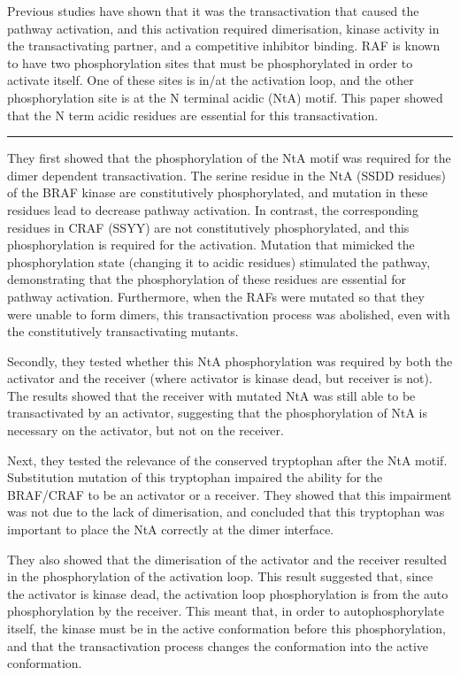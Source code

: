 \documentclass[a4paper,12pt]{article}
\begin{document}
Previous studies have shown that it was the transactivation that caused the pathway activation, and this activation required dimerisation, kinase activity in the transactivating partner, and a competitive inhibitor binding.
RAF is known to have two phosphorylation sites that must be phosphorylated in order to activate itself.
One of these sites is in/at the activation loop, and the other phosphorylation site is at the N terminal acidic (NtA) motif.
This paper showed that the N term acidic residues are essential for this transactivation.

\noindent\rule{\textwidth}{0.4pt}

They first showed that the phosphorylation of the NtA motif was required for the dimer dependent transactivation.
The serine residue in the NtA (SSDD residues) of the BRAF kinase are constitutively phosphorylated, and mutation in these residues lead to decrease pathway activation.
In contrast, the corresponding residues in CRAF (SSYY) are not constitutively phosphorylated, and this phosphorylation is required for the activation.
Mutation that mimicked the phosphorylation state (changing it to acidic residues) stimulated the pathway, demonstrating that the phosphorylation of these residues are essential for pathway activation.
Furthermore, when the RAFs were mutated so that they were unable to form dimers, this transactivation process was abolished, even with the constitutively transactivating mutants.

Secondly, they tested whether this NtA phosphorylation was required by both the activator and the receiver (where activator is kinase dead, but receiver is not).
The results showed that the receiver with mutated NtA was still able to be transactivated by an activator, suggesting that the phosphorylation of NtA is necessary on the activator, but not on the receiver.

Next, they tested the relevance of the conserved tryptophan after the NtA motif.
Substitution mutation of this tryptophan impaired the ability for the BRAF/CRAF to be an activator or a receiver.
They showed that this impairment was not due to the lack of dimerisation, and concluded that this tryptophan was important to place the NtA correctly at the dimer interface.

They also showed that the dimerisation of the activator and the receiver resulted in the phosphorylation of the activation loop.
This result suggested that, since the activator is kinase dead, the activation loop phosphorylation is from the auto phosphorylation by the receiver.
This meant that, in order to autophosphorylate itself, the kinase must be in the active conformation before this phosphorylation, and that the transactivation process changes the conformation into the active conformation.
\end{document}
